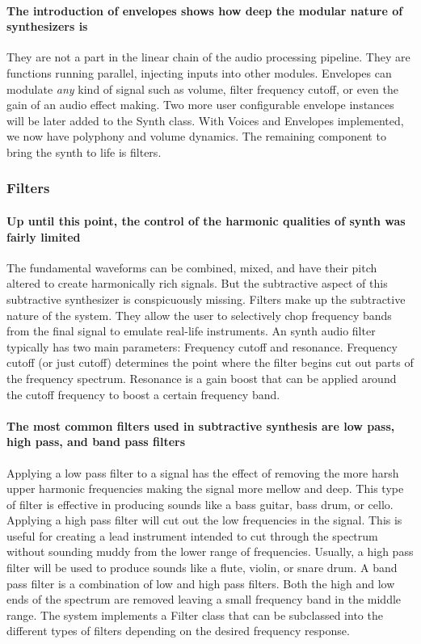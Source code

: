 \documentclass[acmlarge,screen]{acmart}
\begin{document}
	
	\paragraph{The introduction of envelopes shows how deep the modular nature of synthesizers is} They are not a part in the linear chain of the audio processing pipeline. They are functions running parallel, injecting inputs into other modules. Envelopes can modulate \textit{any} kind of signal such as volume, filter frequency cutoff, or even the gain of an audio effect making. Two more user configurable envelope instances will be later added to the Synth class. With Voices and Envelopes implemented, we now have polyphony and volume dynamics. The remaining component to bring the synth to life is filters.

	\subsubsection{Filters}
	\paragraph{Up until this point, the control of the harmonic qualities of synth was fairly limited} The fundamental waveforms can be combined, mixed, and have their pitch altered to create harmonically rich signals. But the subtractive aspect of this subtractive synthesizer is conspicuously missing. Filters make up the subtractive nature of the system. They allow the user to selectively chop frequency bands from the final signal to emulate real-life instruments.\cite{welsh_2006} An synth audio filter typically has two main parameters: Frequency cutoff and resonance. Frequency cutoff (or just cutoff) determines the point where the filter begins cut out parts of the frequency spectrum. Resonance is a gain boost that can be applied around the cutoff frequency to boost a certain frequency band. \cite{musictech}
	
	\paragraph{The most common filters used in subtractive synthesis are low pass, high pass, and band pass filters} Applying a low pass filter to a signal has the effect of removing the more harsh upper harmonic frequencies making the signal more mellow and deep. This type of filter is effective in producing sounds like a bass guitar, bass drum, or cello. Applying a high pass filter will cut out the low frequencies in the signal. This is useful for creating a lead instrument intended to cut through the spectrum without sounding muddy from the lower range of frequencies. Usually, a high pass filter will be used to produce sounds like a flute, violin, or snare drum. A band pass filter is a combination of low and high pass filters. Both the high and low ends of the spectrum are removed leaving a small frequency band in the middle range. The system implements a Filter class that can be subclassed into the different types of filters depending on the desired frequency response. \cite{hass_2021} 
	
\end{document}
